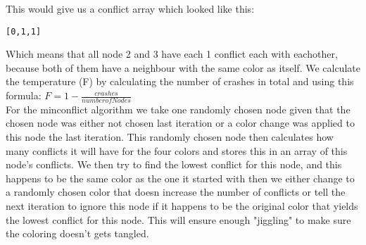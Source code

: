 \documentclass[12pt, a4paper]{article}
\begin{document}
This would give us a conflict array which looked like this:\\
\begin{center}
\begin{verbatim}
[0,1,1]
\end{verbatim}
\end{center}
Which means that all node 2 and 3 have each 1 conflict each with eachother, because both of them have a neighbour with the same color as itself. We calculate the temperature (F) by calculating the number of crashes in total and using this formula: $F = 1- \frac{crashes}{number of Nodes}$ \\
For the minconflict algorithm we take one randomly chosen node given that the chosen node was either not chosen last iteration or a color change was applied to this node the last iteration. This randomly chosen node then calculates how many conflicts it will have for the four colors and stores this in an array of this node's conflicts. We then try to find the lowest conflict for this node, and this happens to be the same color as the one it started with then we either change to a randomly chosen color that doesn increase the number of conflicts or tell the next iteration to ignore this node if it happens to be the original color that yields the lowest conflict for this node. This will ensure enough "jiggling" to make sure the coloring doesn't gets tangled. 
\end{document}
